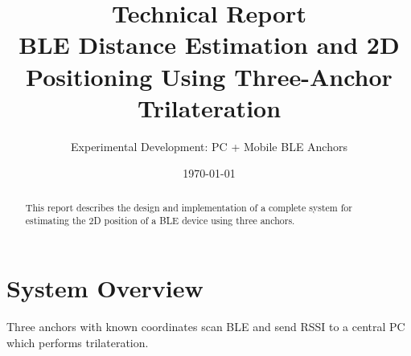 \documentclass[11pt,a4paper]{article}
\title{Technical Report\\BLE Distance Estimation and 2D Positioning Using Three-Anchor Trilateration}
\author{Experimental Development: PC + Mobile BLE Anchors}
\date{\today}
\begin{document}
\maketitle
\begin{abstract}
This report describes the design and implementation of a complete system for estimating the 2D position of a BLE device using three anchors.
\end{abstract}
\tableofcontents
\section{System Overview}
Three anchors with known coordinates scan BLE and send RSSI to a central PC which performs trilateration.
\end{document}

